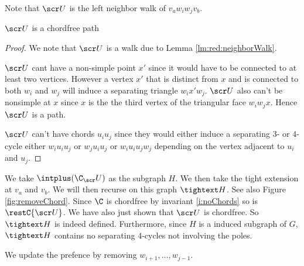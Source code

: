     Note that $\U$ is the left neighbor walk of $v_a w_i w_j v_b$.

    \begin{lemma}
    $\U$ is a chordfree path
    \end{lemma}
    \begin{proof}
    We note that $\U$ is a walk due to Lemma \ref{lm:red:neighborWalk}.

    $\U$ cant have a non-simple point $x'$ since it would have to be connected to at least two vertices. However a vertex $x'$ that is distinct from $x$ and is connected to both $w_i$ and $w_j$ will induce a separating triangle $w_i x' w_j$. $\U$ also can't be nonsimple at $x$ since $x$ is the the third vertex of the triangular face $w_i w_j x$. Hence $\U$ is a path.

    $\scr U$ can't have chords $u_i u_j$ since they would either induce a separating $3$- or $4$-cycle either $w_i u_i u_j$ or $w_j u_i u_j$ or $w_i u_i u_j w_j$ depending on the vertex adjacent to $u_i$ and $u_j$.
    \end{proof}


    We take $\intplus(\C_\U)$ as the subgraph $H$. We then take the tight extension at $v_a$ and $v_b$. We will then recurse on this graph $\tightext H$. See also Figure \ref{fig:removeChord}. Since $\C$ is chordfree by invariant \ref{i:noChords} so is $\restC{\U}$. We have also just shown that $\U$ is chordfree. So $\tightext H$ is indeed defined.
    Furthermore, since $H$ is a induced subgraph of $G$, $\tightext H$ contains no separating $4$-cycles not involving the poles.

    We update the prefence by removing $w_{i+1}, \ldots, w_{j-1}$.

